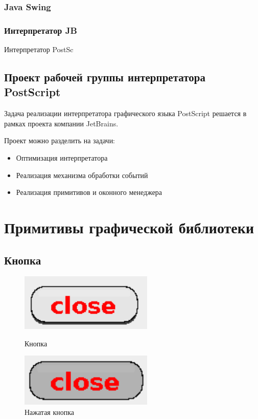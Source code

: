 \documentclass[14pt]{extarticle}
\begin{document}
		\subsubsection{Java Swing}
		\subsubsection{ Интерпретатор JB }
		Интерпретатор PostSc
		
	\subsection{ Проект рабочей группы интерпретатора PostScript }
Задача реализации интерпретатора графического языка PostScript решается в рамках проекта компании JetBrains. 
		
		Проект можно разделить на задачи:
		\begin{itemize}
		\item Оптимизация интерпретатора
		\item Реализация механизма обработки событий
		\item Реализация примитивов и оконного менеджера		
		\end{itemize}	
	
	\pagebreak
	\section{Примитивы графической библиотеки}
	\subsection{Кнопка}
	
		\begin{figure}[h]
		\begin{center}
		\begin{minipage}[h]{0.4\linewidth}
		\includegraphics[width=180pt]{pictures/close1.png}
		\caption{ Кнопка} %
		\label{ris:b1} %
		\end{minipage}
		\hfill 
		\begin{minipage}[h]{0.4\linewidth}
		\includegraphics[width=180pt]{pictures/close2.png}
		\caption{Нажатая кнопка}
		\label{ris:b2}
		\end{minipage}
		\end{center}
		\end{figure}	
		
\end{document}
